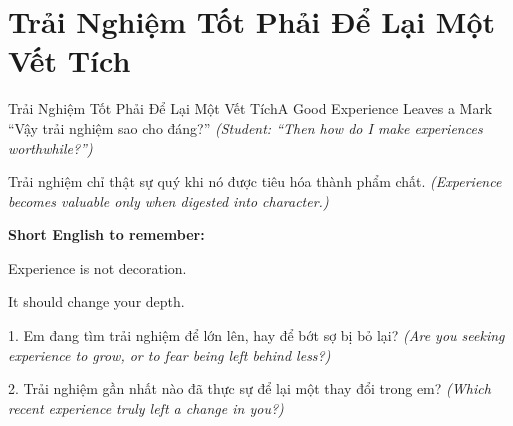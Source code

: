 \section{Trải Nghiệm Tốt Phải Để Lại Một Vết Tích}
\begin{truyen}{Trải Nghiệm Tốt Phải Để Lại Một Vết Tích}{A Good Experience Leaves a Mark}
 ``Vậy trải nghiệm sao cho đáng?''
\textit{(Student: ``Then how do I make experiences worthwhile?'')}

\end{truyen}

\begin{baihoc}
Trải nghiệm chỉ thật sự quý khi nó được tiêu hóa thành phẩm chất.
\textit{(Experience becomes valuable only when digested into character.)}
\end{baihoc}

\begin{ghinhoanh}
\textbf{Short English to remember:}

Experience is not decoration.

It should change your depth.
\end{ghinhoanh}

\begin{tuhocnhanh}
1. Em đang tìm trải nghiệm để lớn lên, hay để bớt sợ bị bỏ lại? \textit{(Are you seeking experience to grow, or to fear being left behind less?)}

2. Trải nghiệm gần nhất nào đã thực sự để lại một thay đổi trong em? \textit{(Which recent experience truly left a change in you?)}
\end{tuhocnhanh}

\ngancach
